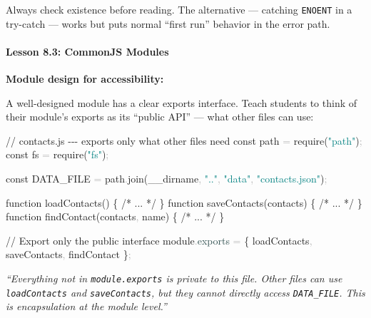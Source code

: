\documentclass[
  justified,
  openright,
]{tufte-book}
\let\subsubsection\paragraph
\let\paragraph\paragraph
\newcommand{\AttributeTok}[1]{\textcolor{DarkSlateGray}{#1}}
\newcommand{\BuiltInTok}[1]{#1}
\newcommand{\CommentTok}[1]{\textcolor{MidGray}{#1}}
\newcommand{\FunctionTok}[1]{\textcolor{BrandBlue}{#1}}
\newcommand{\KeywordTok}[1]{\textcolor{BrandBlue}{#1}}
\newcommand{\NormalTok}[1]{#1}
\newcommand{\OperatorTok}[1]{\textcolor{DarkGray}{#1}}
\newcommand{\PreprocessorTok}[1]{\textcolor{BrandAccent}{#1}}
\newcommand{\StringTok}[1]{\textcolor{Teal}{#1}}
\newenvironment{Shaded}{%
  \begin{snugshade}
}{%
  \end{snugshade}
}
\let\subsubsection\paragraph
\let\paragraph\paragraph
\begin{document}
Always check existence before reading. The alternative --- catching
\texttt{ENOENT} in a try-catch --- works but puts normal ``first run''
behavior in the error path.

\subsubsection{Lesson 8.3: CommonJS
Modules}\label{lesson-8.3-commonjs-modules}

\textbf{Module design for accessibility:}

A well-designed module has a clear exports interface. Teach students to
think of their module's exports as its ``public API'' --- what other
files can use:

\begin{Shaded}
\begin{Highlighting}[]
\CommentTok{// contacts.js {-}{-}{-} exports only what other files need}
\KeywordTok{const}\NormalTok{ path }\OperatorTok{=} \PreprocessorTok{require}\NormalTok{(}\StringTok{"path"}\NormalTok{)}\OperatorTok{;}
\KeywordTok{const}\NormalTok{ fs }\OperatorTok{=} \PreprocessorTok{require}\NormalTok{(}\StringTok{"fs"}\NormalTok{)}\OperatorTok{;}

\KeywordTok{const}\NormalTok{ DATA\_FILE }\OperatorTok{=}\NormalTok{ path}\OperatorTok{.}\FunctionTok{join}\NormalTok{(}\BuiltInTok{\_\_dirname}\OperatorTok{,} \StringTok{".."}\OperatorTok{,} \StringTok{"data"}\OperatorTok{,} \StringTok{"contacts.json"}\NormalTok{)}\OperatorTok{;}

\KeywordTok{function} \FunctionTok{loadContacts}\NormalTok{() \{}
  \CommentTok{/* ... */}
\NormalTok{\}}
\KeywordTok{function} \FunctionTok{saveContacts}\NormalTok{(contacts) \{}
  \CommentTok{/* ... */}
\NormalTok{\}}
\KeywordTok{function} \FunctionTok{findContact}\NormalTok{(contacts}\OperatorTok{,}\NormalTok{ name) \{}
  \CommentTok{/* ... */}
\NormalTok{\}}

\CommentTok{// Export only the public interface}
\NormalTok{module}\OperatorTok{.}\AttributeTok{exports} \OperatorTok{=}\NormalTok{ \{ loadContacts}\OperatorTok{,}\NormalTok{ saveContacts}\OperatorTok{,}\NormalTok{ findContact \}}\OperatorTok{;}
\end{Highlighting}
\end{Shaded}

\emph{``Everything not in \texttt{module.exports} is private to this
file. Other files can use \texttt{loadContacts} and
\texttt{saveContacts}, but they cannot directly access
\texttt{DATA\_FILE}. This is encapsulation at the module level.''}
\end{document}
